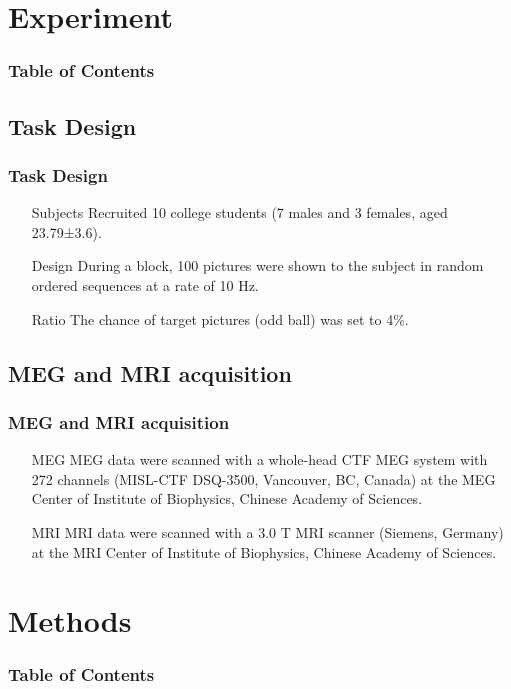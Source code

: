 \documentclass{beamer}
\begin{document}
\section{Experiment}
\begin{frame}[plain]
    \frametitle{Table of Contents}
\end{frame}

\subsection{Task Design}
\begin{frame}
    \frametitle{Task Design}

    \begin{itemize}
        \item [Subjects] Recruited 10 college students (7 males and 3 females, aged 23.79±3.6).
        \item [Design] During a block, 100 pictures were shown to the subject in random ordered sequences at a rate of 10 Hz.
        \item [Ratio] The chance of target pictures (odd ball) was set to 4\%.
    \end{itemize}

\end{frame}

\subsection{MEG and MRI acquisition}
\begin{frame}
    \frametitle{MEG and MRI acquisition}

    \begin{itemize}
        \item [MEG] MEG data were scanned with a whole-head CTF MEG system with 272 channels (MISL-CTF DSQ-3500, Vancouver, BC, Canada) at the MEG Center of Institute of Biophysics, Chinese Academy of Sciences.
        \item [MRI] MRI data were scanned with a 3.0 T MRI scanner (Siemens, Germany) at the MRI Center of Institute of Biophysics, Chinese Academy of Sciences.
    \end{itemize}

\end{frame}

\section{Methods}
\begin{frame}[plain]
    \frametitle{Table of Contents}
\end{frame}
\end{document}
